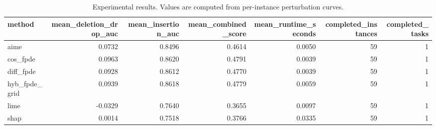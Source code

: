 \begin{table}[t]
\caption{Experimental results. Values are computed from per-instance perturbation curves.}
\label{tab:main_results_computed}
\centering
\begin{tabular}{lrrrrrr}
\toprule
method & mean\_deletion\_drop\_auc & mean\_insertion\_auc & mean\_combined\_score & mean\_runtime\_seconds & completed\_instances & completed\_tasks \\
\midrule
aime & 0.0732 & 0.8496 & 0.4614 & 0.0050 & 59 & 1 \\
cos\_fpde & 0.0963 & 0.8620 & 0.4791 & 0.0039 & 59 & 1 \\
diff\_fpde & 0.0928 & 0.8612 & 0.4770 & 0.0039 & 59 & 1 \\
hyb\_fpde\_grid & 0.0939 & 0.8618 & 0.4779 & 0.0059 & 59 & 1 \\
lime & -0.0329 & 0.7640 & 0.3655 & 0.0097 & 59 & 1 \\
shap & 0.0014 & 0.7518 & 0.3766 & 0.0335 & 59 & 1 \\
\bottomrule
\end{tabular}

\end{table}
